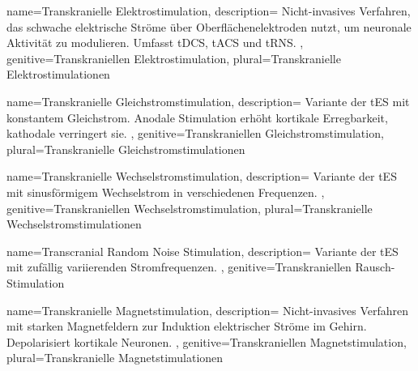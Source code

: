 

{
	name=Transkranielle Elektrostimulation,
	description={
			Nicht-invasives Verfahren, das schwache elektrische Ströme über Oberflächenelektroden nutzt, um neuronale Aktivität zu modulieren. Umfasst \gls{tDCS}, \gls{tACS} und \gls{tRNS}. \cite{woods_technical_2016}\newline
		},
	genitive=Transkraniellen Elektrostimulation,
	plural=Transkranielle Elektrostimulationen
}


{
	name=Transkranielle Gleichstromstimulation,
	description={
			Variante der \gls{tES} mit konstantem Gleichstrom. Anodale Stimulation erhöht kortikale Erregbarkeit, kathodale verringert sie. \cite{woods_technical_2016, thair_transcranial_2017}\newline
		},
	genitive=Transkraniellen Gleichstromstimulation,
	plural=Transkranielle Gleichstromstimulationen
}


{
	name=Transkranielle Wechselstromstimulation,
	description={
			Variante der \gls{tES} mit sinusförmigem Wechselstrom in verschiedenen Frequenzen.\newline
		},
	genitive=Transkraniellen Wechselstromstimulation,
	plural=Transkranielle Wechselstromstimulationen
}


{
	name=Transcranial Random Noise Stimulation,
	description={
			Variante der \gls{tES} mit zufällig variierenden Stromfrequenzen.\newline
		},
	genitive=Transkraniellen Rausch-Stimulation
}


{
	name=Transkranielle Magnetstimulation,
	description={
			Nicht-invasives Verfahren mit starken Magnetfeldern zur Induktion elektrischer Ströme im Gehirn. Depolarisiert kortikale Neuronen. \cite{doccheck_transkranielle_nodate-1}\newline
		},
	genitive=Transkraniellen Magnetstimulation,
	plural=Transkranielle Magnetstimulationen
}


